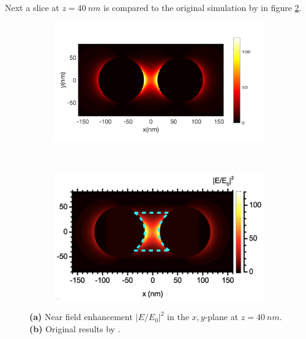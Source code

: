 Next a slice at $z=\SI{40}{nm}$ is compared to the original simulation by \cite{heeg} in figure \ref{slice-comparision}.

\begin{figure}[!h]
  \centering
  \begin{subfigure}{0.50\textwidth}
    \includegraphics[width=\textwidth]{./images/40nm.png}
  \end{subfigure}
  ~
  \begin{subfigure}{0.40\textwidth}
    \includegraphics[width=\textwidth]{./images/local-enhancement-heeg.png}
    \label{heeg-result}
  \end{subfigure}
  \label{slice-comparision}
  \caption{\textbf{(a)} Near field enhancement $|E/E_0|^2$ in the $x,y$-plane at $z=\SI{40}{nm}$. \textbf{(b)} Original results by \cite{heeg}.}
\end{figure}


